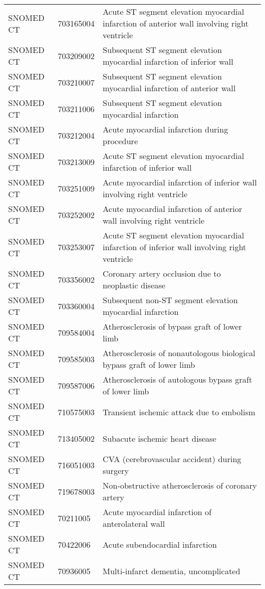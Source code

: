 \begin{longtable}{p{}p{}p{}}
  SNOMED CT & 703165004 & Acute ST segment elevation myocardial infarction of anterior wall involving right ventricle \\ 
  SNOMED CT & 703209002 & Subsequent ST segment elevation myocardial infarction of inferior wall \\ 
  SNOMED CT & 703210007 & Subsequent ST segment elevation myocardial infarction of anterior wall \\ 
  SNOMED CT & 703211006 & Subsequent ST segment elevation myocardial infarction \\ 
  SNOMED CT & 703212004 & Acute myocardial infarction during procedure \\ 
  SNOMED CT & 703213009 & Acute ST segment elevation myocardial infarction of inferior wall \\ 
  SNOMED CT & 703251009 & Acute myocardial infarction of inferior wall involving right ventricle \\ 
  SNOMED CT & 703252002 & Acute myocardial infarction of anterior wall involving right ventricle \\ 
  SNOMED CT & 703253007 & Acute ST segment elevation myocardial infarction of inferior wall involving right ventricle \\ 
  SNOMED CT & 703356002 & Coronary artery occlusion due to neoplastic disease \\ 
  SNOMED CT & 703360004 & Subsequent non-ST segment elevation myocardial infarction \\ 
  SNOMED CT & 709584004 & Atherosclerosis of bypass graft of lower limb \\ 
  SNOMED CT & 709585003 & Atherosclerosis of nonautologous biological bypass graft of lower limb \\ 
  SNOMED CT & 709587006 & Atherosclerosis of autologous bypass graft of lower limb \\ 
  SNOMED CT & 710575003 & Transient ischemic attack due to embolism \\ 
  SNOMED CT & 713405002 & Subacute ischemic heart disease \\ 
  SNOMED CT & 716051003 & CVA (cerebrovascular accident) during surgery \\ 
  SNOMED CT & 719678003 & Non-obstructive atherosclerosis of coronary artery \\ 
  SNOMED CT & 70211005 & Acute myocardial infarction of anterolateral wall \\ 
  SNOMED CT & 70422006 & Acute subendocardial infarction \\ 
  SNOMED CT & 70936005 & Multi-infarct dementia, uncomplicated \\ 

\end{longtable}
